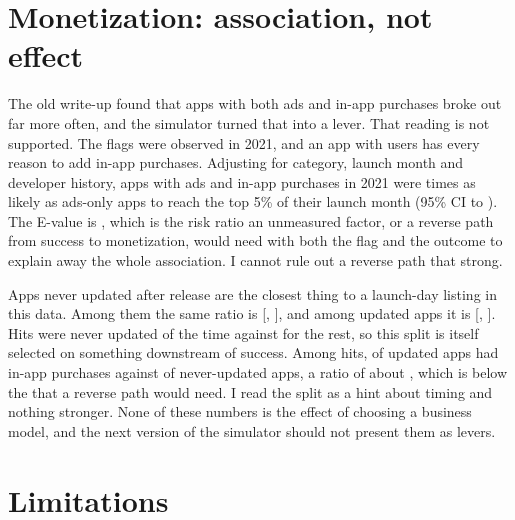\documentclass[11pt]{article}
\begin{document}
\section{Monetization: association, not effect}

The old write-up found that apps with both ads and in-app purchases broke out far more often, and the simulator
turned that into a lever. That reading is not supported. The flags were observed in 2021, and an app with users has
every reason to add in-app purchases. Adjusting for category, launch month and developer history, apps with ads and
in-app purchases in 2021 were \RRAdsIapAll{} times as likely as ads-only apps to reach the top 5\% of their launch
month (95\% CI \RRAdsIapAllLo{} to \RRAdsIapAllHi{}). The E-value is \EAdsIapAll{} \citep{vanderweele2017}, which is the risk ratio an
unmeasured factor, or a reverse path from success to monetization, would need with both the flag and the outcome to
explain away the whole association. I cannot rule out a reverse path that strong.

Apps never updated after release are the closest thing to a launch-day listing in this data. Among them the same
ratio is \RRAdsIapNever{} [\RRAdsIapNeverLo, \RRAdsIapNeverHi], and among updated apps it is \RRAdsIapUpd{}
[\RRAdsIapUpdLo, \RRAdsIapUpdHi]. Hits were never updated \NeverHits{} of the time against \NeverRest{} for the rest,
so this split is itself selected on something downstream of success. Among hits, \IapHitsUpd{} of updated apps had
in-app purchases against \IapHitsNever{} of never-updated apps, a ratio of about \IapHitsRatio{}, which is below the \EAdsIapAll{}
that a reverse path would need. I read the split as a hint about timing and nothing stronger. None of these numbers is the effect of choosing a
business model, and the next version of the simulator should not present them as levers.

\section{Limitations}
\label{sec:limits}
\end{document}
